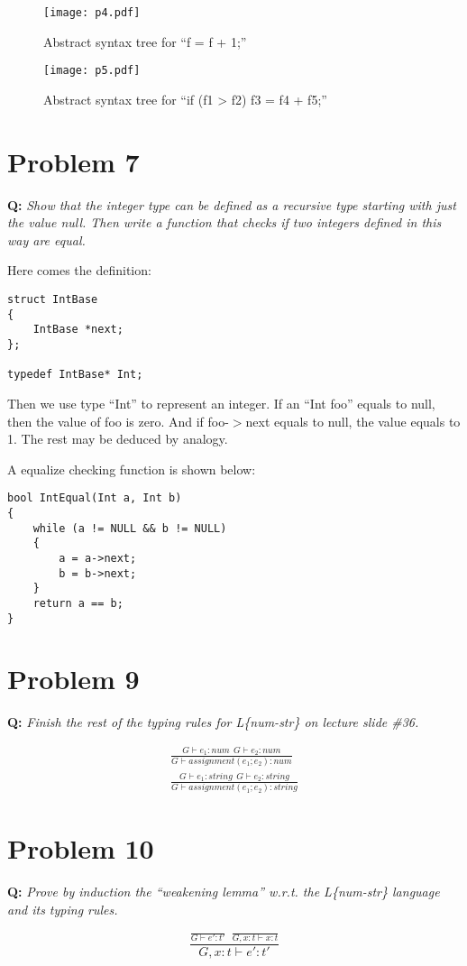 \documentclass{article}
\begin{document}
\begin{figure}[hp]
\centering
\texttt{[image: p4.pdf]}
\caption{Abstract syntax tree for ``f = f + 1;''}
\label{p:6d}
\end{figure}

\begin{figure}[hp]
\centering
\texttt{[image: p5.pdf]}
\caption{Abstract syntax tree for ``if (f1 > f2) f3 = f4 + f5;''}
\label{p:6e}
\end{figure}

\section*{Problem 7}
\textbf{Q:} \textit{Show that the integer type can be defined as a recursive type starting with just the value null. Then write a function that checks if two integers defined in this way are equal.}

Here comes the definition:

\begin{lstlisting}
struct IntBase
{
    IntBase *next;
};

typedef IntBase* Int;
\end{lstlisting}

Then we use type ``Int'' to represent an integer. If an ``Int foo'' equals to null, then the value of foo is zero. And if foo-$>$next equals to null, the value equals to 1. The rest may be deduced by analogy.

A equalize checking function is shown below:

\begin{lstlisting}
bool IntEqual(Int a, Int b)
{
    while (a != NULL && b != NULL)
    {
        a = a->next;
        b = b->next;
    }
    return a == b;
}
\end{lstlisting}

\section*{Problem 9}
\textbf{Q:} \textit{Finish the rest of the typing rules for L\{num-str\} on lecture slide \#36.}

\begin{align*}
\frac{G \vdash e_1: num\ \ G \vdash e_2: num}{G \vdash assignment(e_1; e_2): num} \\
\frac{G \vdash e_1: string\ \ G \vdash e_2: string}{G \vdash assignment(e_1; e_2): string}
\end{align*}

\section*{Problem 10}
\textbf{Q:} \textit{Prove by induction the ``weakening lemma'' w.r.t. the L\{num-str\} language and its typing rules.}

\begin{equation*}
\displaystyle{\frac{\frac{}{G \vdash e': t'}\ \ \frac{}{G, x: t \vdash x: t}}{G, x: t \vdash e': t'}}
\end{equation*}
\end{document}
